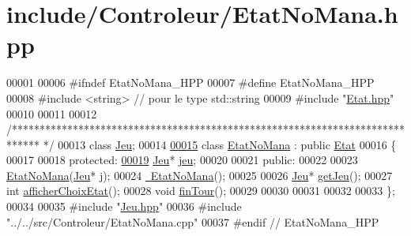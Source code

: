 \hypertarget{_etat_no_mana_8hpp_source}{\section{include/\-Controleur/\-Etat\-No\-Mana.hpp}
}

\begin{DoxyCode}
00001 
00006 \textcolor{preprocessor}{#ifndef EtatNoMana\_HPP}
00007 \textcolor{preprocessor}{}\textcolor{preprocessor}{#define EtatNoMana\_HPP}
00008 \textcolor{preprocessor}{}\textcolor{preprocessor}{#include <string>} \textcolor{comment}{// pour le type std::string}
00009 \textcolor{preprocessor}{#include "\hyperlink{_etat_8hpp}{Etat.hpp}"}
00010 
00011 
00012 \textcolor{comment}{/*****************************************************************************
      */}
00013 \textcolor{keyword}{class }\hyperlink{class_jeu}{Jeu};
00014 
\hypertarget{_etat_no_mana_8hpp_source_l00015}{}\hyperlink{class_etat_no_mana}{00015} \textcolor{keyword}{class }\hyperlink{class_etat_no_mana}{EtatNoMana} : \textcolor{keyword}{public} \hyperlink{class_etat}{Etat}
00016 \{
00017 
00018     \textcolor{keyword}{protected}:
\hypertarget{_etat_no_mana_8hpp_source_l00019}{}\hyperlink{class_etat_no_mana_a8ddcdb9981a36c8baa31d1979272ff72}{00019}         \hyperlink{class_jeu}{Jeu}* \hyperlink{class_etat_no_mana_a8ddcdb9981a36c8baa31d1979272ff72}{jeu};   
00020 
00021     \textcolor{keyword}{public}:
00022         
00023         \hyperlink{class_etat_no_mana_a506d5de276476b23f9c86864b4c439fa}{EtatNoMana}(\hyperlink{class_jeu}{Jeu}* j);
00024         \hyperlink{class_etat_no_mana_aaae2ecdedcef4451b0a0f7c88aad4c71}{~EtatNoMana}();
00025 
00026         \hyperlink{class_jeu}{Jeu}* \hyperlink{class_etat_no_mana_a153d0656498f8e15d0c550fc4898f5fe}{getJeu}();
00027         \textcolor{keywordtype}{int} \hyperlink{class_etat_no_mana_aa67bb9f558eaef0d07939a4747d12192}{afficherChoixEtat}();
00028         \textcolor{keywordtype}{void} \hyperlink{class_etat_no_mana_a14567fee07c6c1a541885fcf2499cd56}{finTour}();
00029         
00030         
00031         
00032         
00033 \};
00034 
00035 \textcolor{preprocessor}{#include "\hyperlink{_jeu_8hpp}{Jeu.hpp}"}
00036 \textcolor{preprocessor}{#include "../../src/Controleur/EtatNoMana.cpp"}
00037 \textcolor{preprocessor}{#endif // EtatNoMana\_HPP        }
\end{DoxyCode}
